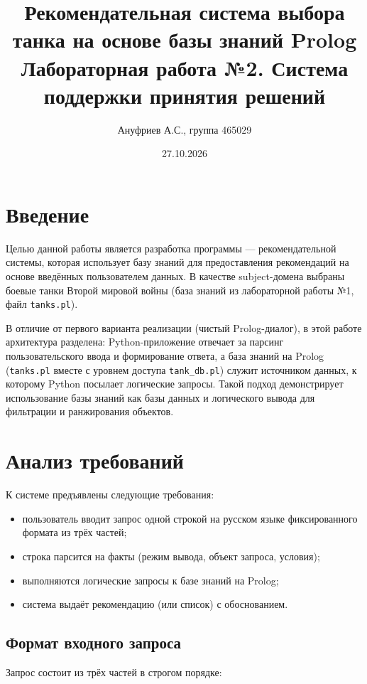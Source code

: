 \documentclass[12pt,a4paper]{article}
\title{Рекомендательная система выбора танка на основе базы знаний Prolog\\
\large Лабораторная работа №2. Система поддержки принятия решений}
\author{Ануфриев А.С., группа 465029}
\date{27.10.2026}
\begin{document}
\maketitle

\section*{Введение}

Целью данной работы является разработка программы --- рекомендательной системы, которая использует базу знаний для предоставления рекомендаций на основе введённых пользователем данных. В качестве subject-домена выбраны боевые танки Второй мировой войны (база знаний из лабораторной работы №1, файл \texttt{tanks.pl}).

В отличие от первого варианта реализации (чистый Prolog-диалог), в этой работе архитектура разделена: Python-приложение отвечает за парсинг пользовательского ввода и формирование ответа, а база знаний на Prolog (\texttt{tanks.pl} вместе с уровнем доступа \texttt{tank\_db.pl}) служит источником данных, к которому Python посылает логические запросы. Такой подход демонстрирует использование базы знаний как базы данных и логического вывода для фильтрации и ранжирования объектов.

\section*{Анализ требований}

К системе предъявлены следующие требования:
\begin{itemize}
\item пользователь вводит запрос одной строкой на русском языке фиксированного формата из трёх частей;
\item строка парсится на факты (режим вывода, объект запроса, условия);
\item выполняются логические запросы к базе знаний на Prolog;
\item система выдаёт рекомендацию (или список) с обоснованием.
\end{itemize}

\subsection*{Формат входного запроса}

Запрос состоит из трёх частей в строгом порядке:
\end{document}
